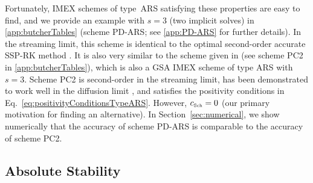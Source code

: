 Fortunately, IMEX schemes of type~ARS satisfying these properties are easy to find, and we provide an example with $s=3$ (two implicit solves) in \ref{app:butcherTables} (scheme PD-ARS; see \ref{app:PD-ARS} for further details).  
In the streaming limit, this scheme is identical to the optimal second-order accurate SSP-RK method \cite{gottlieb_etal_2001}.  
It is also very similar to the scheme given in \cite{mcclarren_etal_2008} (see scheme PC2 in \ref{app:butcherTables}), which is also a GSA IMEX scheme of type ARS with $s=3$.  
Scheme PC2 is second-order in the streaming limit, has been demonstrated to work well in the diffusion limit \cite{mcclarren_etal_2008,radice_etal_2013}, and satisfies the positivity conditions in Eq.~\eqref{eq:positivityConditionsTypeARS}.  
However, $c_{\mbox{\tiny Sch}}=0$ (our primary motivation for finding an alternative).  
In Section~\ref{sec:numerical}, we show numerically that the accuracy of scheme PD-ARS is comparable to the accuracy of scheme PC2.  

\subsection{Absolute Stability}


